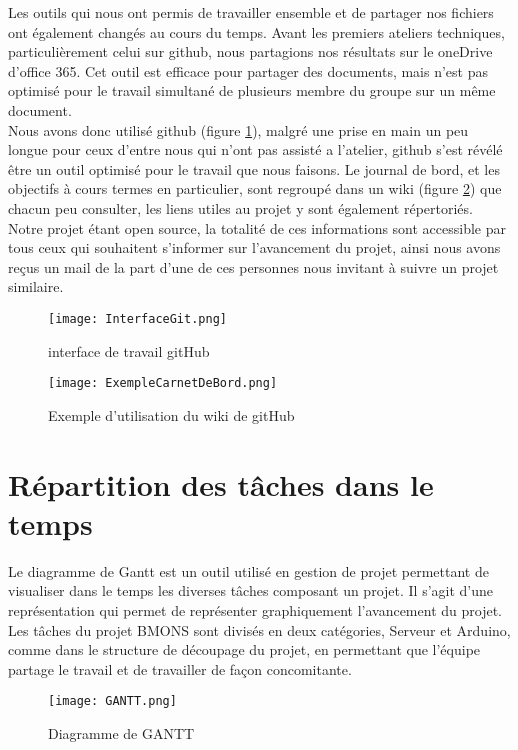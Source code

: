Les outils qui nous ont permis de travailler ensemble et de partager nos fichiers ont également changés au cours du temps. 
Avant les premiers ateliers techniques, particulièrement celui sur github, nous partagions nos résultats sur le oneDrive d'office 365. Cet outil est efficace pour partager des documents, mais n'est pas optimisé pour le travail simultané de plusieurs membre du groupe sur un même document. \\
Nous avons donc utilisé github (figure \ref{fig:InterfaceGit}), malgré une prise en main un peu longue pour ceux d'entre nous qui n'ont pas assisté a l'atelier, github s'est révélé être un outil optimisé pour le travail que nous faisons. Le journal de bord, et les objectifs à cours termes en particulier, sont regroupé dans un wiki (figure \ref{fig:ExempleWiki}) que chacun peu consulter, les liens utiles au projet y sont également répertoriés. Notre projet étant open source, la totalité de ces informations sont accessible par tous ceux qui souhaitent s'informer sur l'avancement du projet, ainsi nous avons reçus un mail de la part d'une de ces personnes nous invitant à suivre un projet similaire.


\begin{figure}[h!]
\centering\texttt{[image: InterfaceGit.png]}
\caption{\label{fig:InterfaceGit} interface de travail gitHub}
\end{figure}

\begin{figure}[h!]
\centering\texttt{[image: ExempleCarnetDeBord.png]}
\caption{\label{fig:ExempleWiki} Exemple d'utilisation du wiki de gitHub}
\end{figure}

\chapter{Répartition des tâches dans le temps}

Le diagramme de Gantt est un outil utilisé en gestion de projet permettant de visualiser dans le temps les diverses tâches composant un projet. Il s'agit d'une représentation qui permet de représenter graphiquement l'avancement du projet. Les tâches du projet BMONS sont divisés en deux catégories, Serveur et Arduino, comme dans le structure de découpage du projet, en permettant que l'équipe partage le travail et de travailler de façon concomitante.

\begin{figure}[h!]
\centering\texttt{[image: GANTT.png]}
\caption{\label{fig:GANTT} Diagramme de GANTT}
\end{figure}


